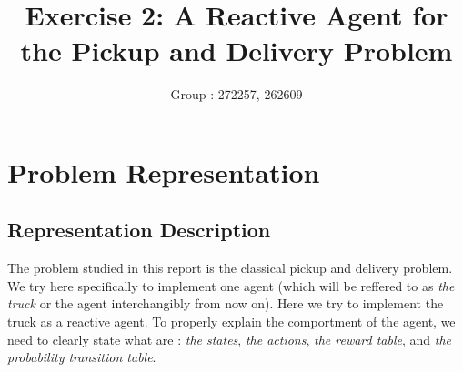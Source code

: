 \documentclass[11pt]{article}
\title{\bf Exercise 2: A Reactive Agent for the Pickup and Delivery Problem}
\author{Group \textnumero: 272257, 262609}
\begin{document}
\maketitle

\section{Problem Representation}

\subsection{Representation Description}

 	The problem studied in this report is the classical pickup and delivery problem. We try here specifically to implement one agent (which will be reffered to as \emph{the truck} or the agent interchangibly from now on). Here we try to implement the truck as a reactive agent. 
 	To properly explain the comportment of the agent, we need to clearly state what are : \emph{the states}, \emph{the actions}, \emph{the reward table}, and \emph{the probability transition table}.
\end{document}
